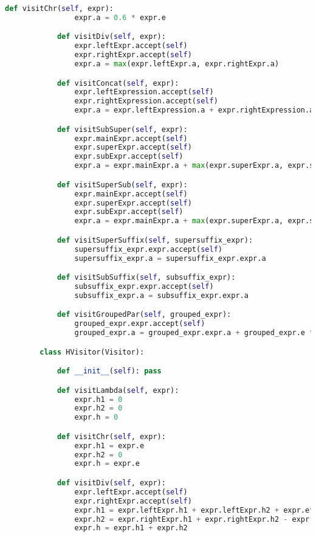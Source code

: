\begin{lstlisting}[language=Python]
            def visitChr(self, expr):
                expr.a = 0.6 * expr.e

            def visitDiv(self, expr):
                expr.leftExpr.accept(self)
                expr.rightExpr.accept(self)
                expr.a = max(expr.leftExpr.a, expr.rightExpr.a)

            def visitConcat(self, expr):
                expr.leftExpression.accept(self)
                expr.rightExpression.accept(self)
                expr.a = expr.leftExpression.a + expr.rightExpression.a

            def visitSubSuper(self, expr):
                expr.mainExpr.accept(self)
                expr.superExpr.accept(self)
                expr.subExpr.accept(self)
                expr.a = expr.mainExpr.a + max(expr.superExpr.a, expr.subExpr.a)

            def visitSuperSub(self, expr):
                expr.mainExpr.accept(self)
                expr.superExpr.accept(self)
                expr.subExpr.accept(self)
                expr.a = expr.mainExpr.a + max(expr.superExpr.a, expr.subExpr.a)

            def visitSuperSuffix(self, supersuffix_expr):
                supersuffix_expr.expr.accept(self)
                supersuffix_expr.a = supersuffix_expr.expr.a

            def visitSubSuffix(self, subsuffix_expr):
                subsuffix_expr.expr.accept(self)
                subsuffix_expr.a = subsuffix_expr.expr.a

            def visitGroupedPar(self, grouped_expr):
                grouped_expr.expr.accept(self)
                grouped_expr.a = grouped_expr.expr.a + grouped_expr.e * 2 * 0.6 # contar ()

        class HVisitor(Visitor):

            def __init__(self): pass

            def visitLambda(self, expr):
                expr.h1 = 0
                expr.h2 = 0
                expr.h = 0

            def visitChr(self, expr):
                expr.h1 = expr.e
                expr.h2 = 0
                expr.h = expr.e

            def visitDiv(self, expr):
                expr.leftExpr.accept(self)
                expr.rightExpr.accept(self)
                expr.h1 = expr.leftExpr.h1 + expr.leftExpr.h2 + expr.e*0.6
                expr.h2 = expr.rightExpr.h1 + expr.rightExpr.h2 - expr.e*0.6
                expr.h = expr.h1 + expr.h2


\end{lstlisting}
